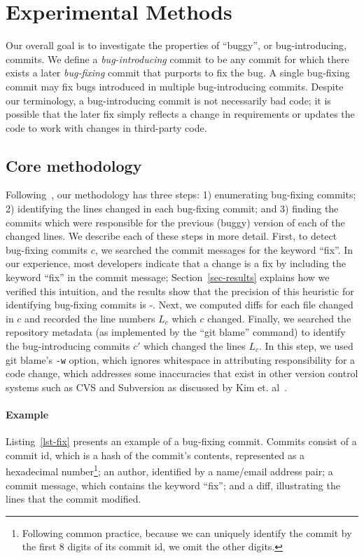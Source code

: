 \section{Experimental Methods}
\label{sec:method}
Our overall goal is to investigate the properties of ``buggy'', or
bug-introducing, commits. We define a \emph{bug-introducing} commit to be any
commit for which there exists a later \emph{bug-fixing} commit that purports to
fix the bug. A single bug-fixing commit may fix bugs introduced in
multiple bug-introducing commits. Despite our terminology,
a bug-introducing commit is not necessarily bad code; it is possible 
that the later fix simply reflects a change in requirements or updates
the code to work with changes in third-party code.

\subsection{Core methodology}
Following~\cite{sliwerski-msr-2005}, our methodology has three steps: 1) enumerating bug-fixing commits; 2)
identifying the lines changed in each bug-fixing commit; and 3)
finding the commits which were responsible for the previous (buggy)
version of each of the changed lines. We describe each of these steps
in more detail. First, to detect bug-fixing commits $c$, we searched
the commit messages for the keyword ``fix''. In our experience, most
developers indicate that a change is a fix by including the keyword
``fix'' in the commit message; Section~\ref{sec-results} explains how
we verified this intuition, and the results show that the precision
of this heuristic for identifying bug-fixing commits is \postP-\linuxP. 
Next, we computed diffs for each file
changed in $c$ and recorded the line numbers $L_c$ which $c$
changed. Finally, we searched the repository metadata (as implemented by
the ``git blame'' command) to identify the bug-introducing commits
$c'$ which changed the lines $L_c$. In this step, we used git 
blame's {\tt -w} option, which ignores whitespace in attributing 
responsibility for a code change, which addresses some 
inaccuracies that exist in other version control systems such as CVS and Subversion as 
discussed by Kim et. al~\cite{2006-automatic}.

\paragraph{Example} Listing~\ref{lst-fix} presents an example of a
bug-fixing commit. Commits consist of a commit id, which is a hash
of the commit's contents, represented as a hexadecimal number\footnote{Following common practice, because we can uniquely identify the commit by the first 8 digits of its commit id, we omit the other digits.}; an
author, identified by a name/email address pair; a commit message,
which contains the keyword ``fix''; and a diff, illustrating the lines
that the commit modified. 

